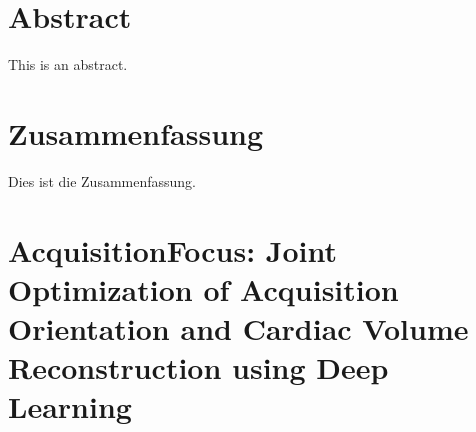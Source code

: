 \documentclass[
	11pt,
	a4paper,
	twoside,
	headsepline,
	titlepage,
	DIV=11,
	BCOR=12mm,
	captions=tableheading,
	chapterprefix=on,
	numbers=noenddot,
]{scrbook}
\begin{document}
    \thispagestyle{headings}
    

    \enlargethispage{1\baselineskip}
    \setcounter{page}{1}

    \chapter*{Abstract}
        This is an abstract.

    \chapter*{Zusammenfassung}
        Dies ist die Zusammenfassung.
    \cleardoublepage

    \tableofcontents
    \cleardoublepage

    
    
    \chapter[AcquisitionFocus]{AcquisitionFocus: Joint Optimization of Acquisition Orientation and Cardiac Volume Reconstruction using Deep Learning}
        
    

    \printbibliography[heading=bibintoc]
\end{document}

